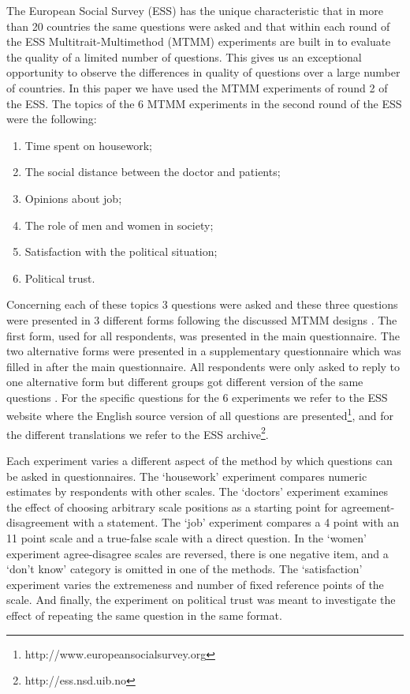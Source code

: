 \documentclass[a4paper,12pt]{article}
\begin{document}
The European Social Survey (ESS) has the unique characteristic that in more than 20 countries the same questions were asked and that within each round of the ESS Multitrait-Multimethod (MTMM) experiments are built in to evaluate the quality of a limited number of questions. This gives us an exceptional opportunity to observe the differences in quality of questions over a large number of countries. In this paper we have used the MTMM experiments of round 2 of the ESS. The topics of the 6 MTMM experiments in the second round of the ESS were the following:
\begin{enumerate}
\item Time spent on housework;
\item The social distance between the doctor and patients;
\item Opinions about job;
\item The role of men and women in society;
\item Satisfaction with the political situation;
\item Political trust.
\end{enumerate}
Concerning each of these topics 3 questions were asked and these three questions were presented in 3 different forms following the discussed MTMM designs \cite{campbell_convergent_1959}.   The first form,  used for all respondents, was presented in the main questionnaire. The two alternative forms were presented in a supplementary questionnaire which was filled in after the main questionnaire. All respondents were only asked to reply to one alternative form but different groups got different version of the same questions \cite{saris_new_2004}. For the specific questions for the 6 experiments we refer to the ESS website where the English source version of all questions are presented\footnote{http://www.europeansocialsurvey.org}, and for the different translations we refer to the ESS archive\footnote{http://ess.nsd.uib.no}.

	Each experiment varies a different aspect of the method by which questions can be asked in questionnaires. The `housework' experiment compares numeric estimates by respondents with other scales. The `doctors' experiment examines the effect of choosing arbitrary scale positions as a starting point for agreement-disagreement with a statement. The `job' experiment compares a 4 point with an 11 point scale and a true-false scale with a direct question. In the `women' experiment agree-disagree scales are reversed, there is one negative item, and a `don't know' category is omitted in one of the methods.  The `satisfaction' experiment varies the extremeness and number of fixed reference points of the scale. And finally, the experiment on political trust was meant to investigate the effect of repeating the same question in the same format.
\end{document}
